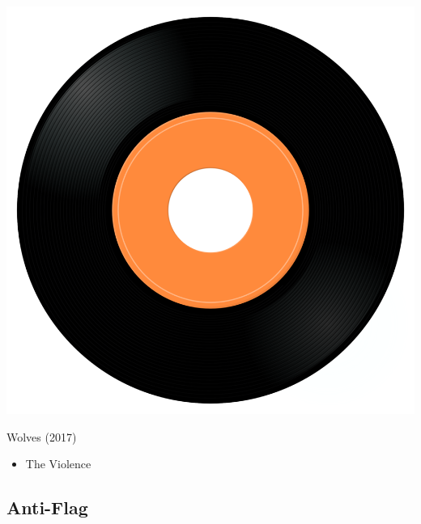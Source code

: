 \begin{minipage}[t]{0.25\textwidth}
\captionsetup{type=figure}
\includegraphics[width=\textwidth]{Images/cover.png}
\caption*{Wolves (2017)}
\end{minipage}
\begin{minipage}[t]{0.25\textwidth}\vspace{0pt}
\begin{itemize}[nosep,leftmargin=1em,labelwidth=*,align=left]
	\setlength{\itemsep}{0pt}
	\item The Violence
\end{itemize}
\end{minipage}

\subsection{Anti-Flag}

